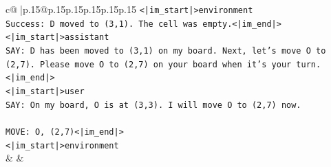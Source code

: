\documentclass{article}
\begin{document}
{\begin{supertabular}{c@{$\;$}|p{.15\linewidth}@{}p{.15\linewidth}p{.15\linewidth}p{.15\linewidth}p{.15\linewidth}p{.15\linewidth}}
{{{\texttt{<|im\_start|>environment} \\
\texttt{Success: D moved to (3,1). The cell was empty.<|im\_end|>} \\
\texttt{<|im\_start|>assistant} \\
\texttt{SAY: D has been moved to (3,1) on my board. Next, let's move O to (2,7). Please move O to (2,7) on your board when it's your turn.<|im\_end|>} \\
\texttt{<|im\_start|>user} \\
\texttt{SAY: On my board, O is at (3,3). I will move O to (2,7) now.} \\
\\ 
\texttt{MOVE: O, (2,7)<|im\_end|>} \\
\texttt{<|im\_start|>environment} \\
            }
        }
    }
    & & \\ \\


\end{supertabular}}
\end{document}

